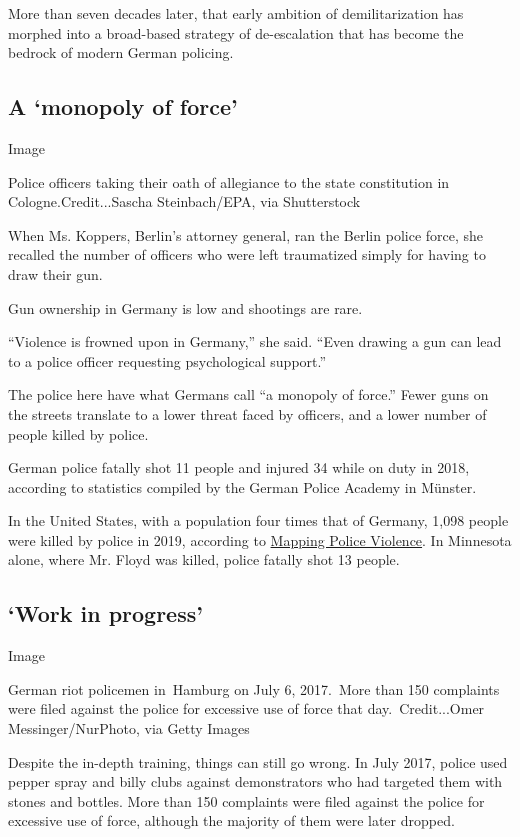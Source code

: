 More than seven decades later, that early ambition of demilitarization
has morphed into a broad-based strategy of de-escalation that has become
the bedrock of modern German policing.

\hypertarget{a-monopoly-of-force}{%
\subsection{A `monopoly of force'}\label{a-monopoly-of-force}}

Image

Police officers taking their oath of allegiance to the state
constitution in Cologne.Credit...Sascha Steinbach/EPA, via Shutterstock

When Ms. Koppers, Berlin's attorney general, ran the Berlin police
force, she recalled the number of officers who were left traumatized
simply for having to draw their gun.

Gun ownership in Germany is low and shootings are rare.

``Violence is frowned upon in Germany,'' she said. ``Even drawing a gun
can lead to a police officer requesting psychological support.''

The police here have what Germans call ``a monopoly of force.'' Fewer
guns on the streets translate to a lower threat faced by officers, and a
lower number of people killed by police.

German police fatally shot 11 people and injured 34 while on duty in
2018, according to statistics compiled by the German Police Academy in
Münster.

In the United States, with a population four times that of Germany,
1,098 people were killed by police in 2019, according to
\href{https://mappingpoliceviolence.org/}{Mapping Police Violence}. In
Minnesota alone, where Mr. Floyd was killed, police fatally shot 13
people.

\hypertarget{work-in-progress}{%
\subsection{`Work in progress'}\label{work-in-progress}}

Image

German riot policemen in~Hamburg on July 6, 2017.~More than 150
complaints were filed against the police for excessive use of force that
day.~Credit...Omer Messinger/NurPhoto, via Getty Images

Despite the in-depth training, things can still go wrong. In July 2017,
police used pepper spray and billy clubs against demonstrators who had
targeted them with stones and bottles. More than 150 complaints were
filed against the police for excessive use of force, although the
majority of them were later dropped.

